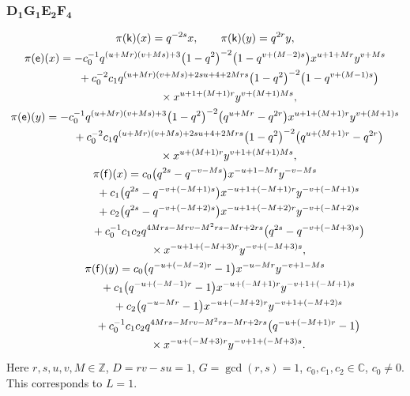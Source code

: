 \documentclass[10pt,a4paper]{amsart}
\numberwithin{equation}{section}
\begin{document}
\subsubsection*{$\boldsymbol{D_1G_1E_2F_4}$}
\begin{gather*}
\pi(\mathsf{k})(x)= q^{-2s}x ,\qquad\pi(\mathsf{k})(y)=q^{2r}y ,\\
\pi(\mathsf{e})(x)= -c_0^{-1}q^{(u+Mr)(v+Ms)+3}\big(1-q^2\big)^{-2}\big(1-q^{v+(M-2)s}\big)x^{u+1+Mr}y^{v+Ms}\\
\hphantom{\pi(\mathsf{e})(x)=}{}+ c_0^{-2}c_1q^{(u+Mr)(v+Ms)+2su+4+2Mrs}\big(1-q^2\big)^{-2}\big(1-q^{v+(M-1)s}\big)\\
\hphantom{\pi(\mathsf{e})(x)=}{}\times x^{u+1+(M+1)r}y^{v+(M+1)Ms} ,\\
\pi(\mathsf{e})(y)= -c_0^{-1}q^{(u+Mr)(v+Ms)+3}\big(1-q^2\big)^{-2}\big(q^{u+Mr}-q^{2r}\big)x^{u+1+(M+1)r}y^{v+(M+1)s}\\
\hphantom{\pi(\mathsf{e})(y)=}{}+ c_0^{-2}c_1q^{(u+Mr)(v+Ms)+2su+4+2Mrs}\big(1-q^2\big)^{-2}\big(q^{u+(M+1)r}-q^{2r}\big)\\
\hphantom{\pi(\mathsf{e})(y)=}{}\times x^{u+(M+1)r}y^{v+1+(M+1)Ms} ,\\
\pi(\mathsf{f})(x)= c_0\big(q^{2s}-q^{-v-Ms}\big)x^{-u+1-Mr}y^{-v-Ms}\\
\hphantom{\pi(\mathsf{f})(x)=}{}+ c_1\big(q^{2s}-q^{-v+(-M+1)s}\big)x^{-u+1+(-M+1)r}y^{-v+(-M+1)s}\\
\hphantom{\pi(\mathsf{f})(x)=}{}+ c_2\big(q^{2s}-q^{-v+(-M+2)s}\big)x^{-u+1+(-M+2)r}y^{-v+(-M+2)s}\\
\hphantom{\pi(\mathsf{f})(x)=}{}+ c_0^{-1}c_1c_2q^{4Mrs-Mrv-M^2rs-Mr+2rs}\big(q^{2s}-q^{-v+(-M+3)s}\big)\\
\hphantom{\pi(\mathsf{f})(x)=}{}\times x^{-u+1+(-M+3)r}y^{-v+(-M+3)s} ,\\
\pi(\mathsf{f})(y)= c_0\big(q^{-u+(-M-2)r}-1\big)x^{-u-Mr}y^{-v+1-Ms}\\
\hphantom{\pi(\mathsf{f})(y)=}{} + c_1\big(q^{-u+(-M-1)r}-1\big)x^{-u+(-M+1)r}y^{-v+1+(-M+1)s}\\
\hphantom{\pi(\mathsf{f})(y)=}{} + c_2\big(q^{-u-Mr}-1\big)x^{-u+(-M+2)r}y^{-v+1+(-M+2)s}\\
\hphantom{\pi(\mathsf{f})(y)=}{} + c_0^{-1}c_1c_2q^{4Mrs-Mrv-M^2rs-Mr+2rs}\big(q^{-u+(-M+1)r}-1\big)\\
\hphantom{\pi(\mathsf{f})(y)=}{}\times x^{-u+(-M+3)r}y^{-v+1+(-M+3)s} .
\end{gather*}
Here $r,s,u,v,M\in\mathbb{Z}$, $D=rv-su=1$, $G=\operatorname{gcd}(r,s)=1$, $c_0,c_1,c_2\in\mathbb{C}$, $c_0\ne 0$. This corresponds to $L=1$.
\end{document}
